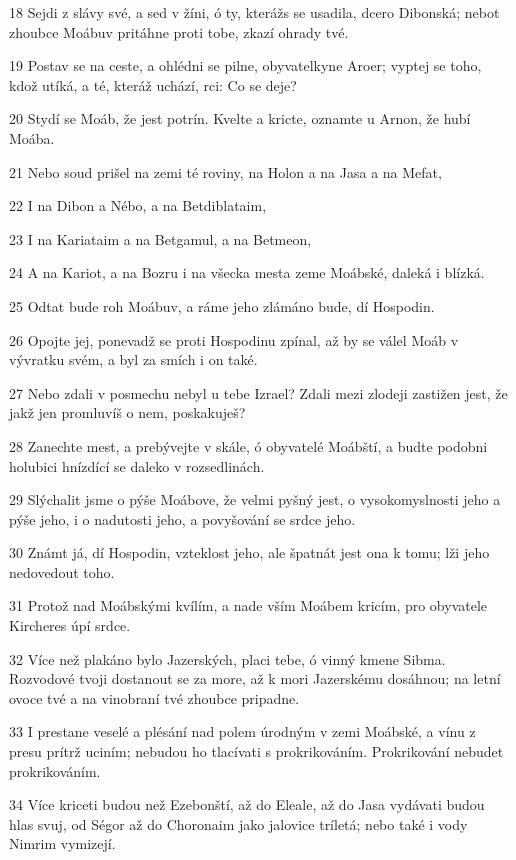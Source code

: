 \par 18 Sejdi z slávy své, a sed v žíni, ó ty, kterážs se usadila, dcero Dibonská; nebot zhoubce Moábuv pritáhne proti tobe, zkazí ohrady tvé.
\par 19 Postav se na ceste, a ohlédni se pilne, obyvatelkyne Aroer; vyptej se toho, kdož utíká, a té, kteráž uchází, rci: Co se deje?
\par 20 Stydí se Moáb, že jest potrín. Kvelte a kricte, oznamte u Arnon, že hubí Moába.
\par 21 Nebo soud prišel na zemi té roviny, na Holon a na Jasa a na Mefat,
\par 22 I na Dibon a Nébo, a na Betdiblataim,
\par 23 I na Kariataim a na Betgamul, a na Betmeon,
\par 24 A na Kariot, a na Bozru i na všecka mesta zeme Moábské, daleká i blízká.
\par 25 Odtat bude roh Moábuv, a ráme jeho zlámáno bude, dí Hospodin.
\par 26 Opojte jej, ponevadž se proti Hospodinu zpínal, až by se válel Moáb v vývratku svém, a byl za smích i on také.
\par 27 Nebo zdali v posmechu nebyl u tebe Izrael? Zdali mezi zlodeji zastižen jest, že jakž jen promluvíš o nem, poskakuješ?
\par 28 Zanechte mest, a prebývejte v skále, ó obyvatelé Moábští, a budte podobni holubici hnízdící se daleko v rozsedlinách.
\par 29 Slýchalit jsme o pýše Moábove, že velmi pyšný jest, o vysokomyslnosti jeho a pýše jeho, i o nadutosti jeho, a povyšování se srdce jeho.
\par 30 Známt já, dí Hospodin, vzteklost jeho, ale špatnát jest ona k tomu; lži jeho nedovedout toho.
\par 31 Protož nad Moábskými kvílím, a nade vším Moábem kricím, pro obyvatele Kircheres úpí srdce.
\par 32 Více než plakáno bylo Jazerských, placi tebe, ó vinný kmene Sibma. Rozvodové tvoji dostanout se za more, až k mori Jazerskému dosáhnou; na letní ovoce tvé a na vinobraní tvé zhoubce pripadne.
\par 33 I prestane veselé a plésání nad polem úrodným v zemi Moábské, a vínu z presu prítrž uciním; nebudou ho tlacívati s prokrikováním. Prokrikování nebudet prokrikováním.
\par 34 Více kriceti budou než Ezebonští, až do Eleale, až do Jasa vydávati budou hlas svuj, od Ségor až do Choronaim jako jalovice tríletá; nebo také i vody Nimrim vymizejí.
